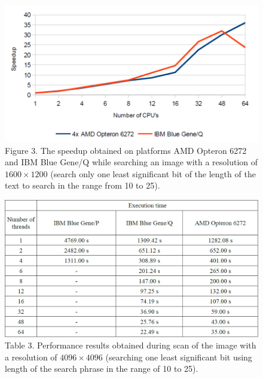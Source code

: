 \documentclass[10pt, a5paper]{article}
\begin{document}
\begin{figure}[h!]
  \centering
  \includegraphics[width=\textwidth]{103_2014_w_Kwiatkowska_speedup.png}
  Figure 3. The speedup obtained on platforms AMD Opteron 6272 and IBM Blue Gene/Q while searching an image with a resolution of $1600\times1200$ (search only one least significant bit of the length of the text to search in the range from 10 to 25).
\end{figure}
\begin{figure}[h!]
  \centering
  \includegraphics[width=\textwidth]{103_2014_w_Kwiatkowska_time2.png}
  Table 3. Performance results obtained during scan of the image with a resolution of $4096\times4096$ (searching one least significant bit using length of the search phrase in the range of 10 to 25).
\end{figure}
\end{document}
